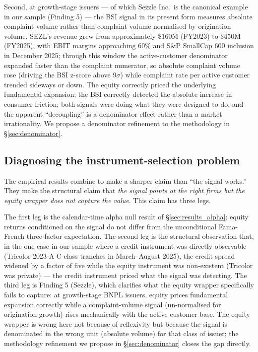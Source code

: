 \documentclass[11pt,a4paper]{article}
\begin{document}
Second, at growth-stage issuers --- of which Sezzle Inc.\ is the canonical example in our sample (Finding 5) --- the BSI signal in its present form measures absolute complaint volume rather than complaint volume normalised by origination volume. SEZL's revenue grew from approximately \$160M (FY2023) to \$450M (FY2025), with EBIT margins approaching 60\% and S\&P SmallCap 600 inclusion in December 2025; through this window the active-customer denominator expanded faster than the complaint numerator, so absolute complaint volume rose (driving the BSI z-score above 9$\sigma$) while complaint rate per active customer trended sideways or down. The equity correctly priced the underlying fundamental expansion; the BSI correctly detected the absolute increase in consumer friction; both signals were doing what they were designed to do, and the apparent ``decoupling'' is a denominator effect rather than a market irrationality. We propose a denominator refinement to the methodology in §\ref{sec:denominator}.

\subsection{Diagnosing the instrument-selection problem}

The empirical results combine to make a sharper claim than ``the signal works.'' They make the structural claim that \emph{the signal points at the right firms but the equity wrapper does not capture the value}. This claim has three legs.

The first leg is the calendar-time alpha null result of §\ref{sec:results_alpha}: equity returns conditioned on the signal do not differ from the unconditional Fama-French three-factor expectation. The second leg is the structural observation that, in the one case in our sample where a credit instrument was directly observable (Tricolor 2023-A C-class tranches in March--August 2025), the credit spread widened by a factor of five \citep{moodysabsdata2025} while the equity instrument was non-existent (Tricolor was private) --- the credit instrument priced what the signal was detecting. The third leg is Finding 5 (Sezzle), which clarifies what the equity wrapper specifically fails to capture: at growth-stage BNPL issuers, equity prices fundamental expansion correctly while a complaint-volume signal (un-normalised for origination growth) rises mechanically with the active-customer base. The equity wrapper is wrong here not because of reflexivity but because the signal is denominated in the wrong unit (absolute volume) for that class of issuer; the methodology refinement we propose in §\ref{sec:denominator} closes the gap directly.
\end{document}
